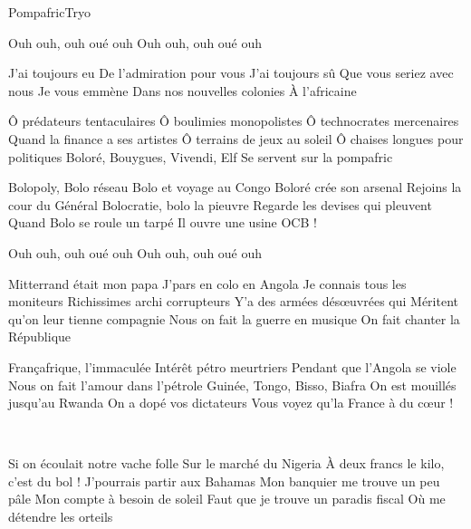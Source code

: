 \documentclass[a4paper,11pt,french]{article}
\begin{document}
\begin{Song}{Pompafric}{Tryo}
\begin{multicols}{2}

\begin{Verse}
Ouh ouh, ouh oué ouh
Ouh ouh, ouh oué ouh
\end{Verse}
\espaceInterStrophe

\begin{Chorus}
J'ai toujours eu
De l'admiration pour vous
J'ai toujours sû
Que vous seriez avec nous
Je vous emmène
Dans nos nouvelles colonies
\`A l'africaine
\end{Chorus}
\espaceInterStrophe

\begin{Verse}
Ô prédateurs tentaculaires
Ô boulimies monopolistes
Ô technocrates mercenaires
Quand la finance a ses artistes
Ô terrains de jeux au soleil
Ô chaises longues pour politiques
Boloré, Bouygues, Vivendi, Elf
Se servent sur la pompafric
\espaceInterStrophe

Bolopoly, Bolo réseau
Bolo et voyage au Congo
Boloré crée son arsenal
Rejoins la cour du Général
Bolocratie, bolo la pieuvre
Regarde les devises qui pleuvent
Quand Bolo se roule un tarpé
Il ouvre une usine OCB !
\end{Verse}
\espaceInterStrophe

\aurefrain
\espaceInterStrophe

\begin{Verse}
Ouh ouh, ouh oué ouh
Ouh ouh, ouh oué ouh
\bis
\vfill
\columnbreak

Mitterrand était mon papa
J'pars en colo en Angola
Je connais tous les moniteurs
Richissimes archi corrupteurs
Y'a des armées dés\oe uvrées qui 
Méritent qu'on leur tienne compagnie
Nous on fait la guerre en musique
On fait chanter la République
\espaceInterStrophe

Françafrique, l'immaculée
Intérêt pétro meurtriers
Pendant que l'Angola se viole
Nous on fait l'amour dans l'pétrole
Guinée, Tongo, Bisso, Biafra
On est mouillés jusqu'au Rwanda
On a dopé vos dictateurs
Vous voyez qu'la France à du c\oe ur !
\end{Verse}
\espaceInterStrophe

\aurefrain\\
\espaceInterStrophe

\begin{Verse}
Si on écoulait notre vache folle
Sur le marché du Nigeria
\`A deux francs le kilo, c'est du bol !
J'pourrais partir aux Bahamas
Mon banquier me trouve un peu pâle
Mon compte à besoin de soleil
Faut que je trouve un paradis fiscal
Où me détendre les orteils
\espaceInterStrophe


\end{Verse}
\end{multicols}
\end{Song}
\end{document}
